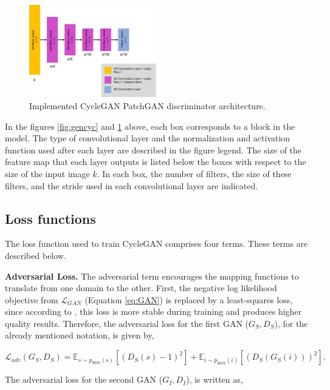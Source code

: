 \begin{figure}[!htb]
  \centering
  \includegraphics[width=0.50\textwidth]{Images/discriminator_cyclegan.jpg}
  \caption{Implemented CycleGAN PatchGAN discriminator architecture.}
  \label{fig:disccyc}
\end{figure}

In the figures \ref{fig:gencyc} and \ref{fig:disccyc} above, each box corresponds to a block in the model. The type of convolutional layer and the normalization and activation function used after each layer are described in the figure legend. The size of the feature map that each layer outputs is listed below the boxes with respect to the size of the input image $k$. In each box, the number of filters, the size of these filters, and the stride used in each convolutional layer are indicated.

\subsection*{Loss functions}

The loss function used to train CycleGAN comprises four terms. These terms are described below.

\textbf{Adversarial Loss.} The adversarial term encourages the mapping functions to translate from one domain to
the other. First, the negative log likelihood objective from $\mathcal{L}_{GAN}$  (Equation \ref{eq:GAN}) is replaced by a least-squares loss, since according to \cite{cycleGAN:original}, this loss is more stable during training and produces higher quality results. Therefore, the adversarial loss for the first GAN ($G_{S}, D_S$), for the already mentioned notation, is given by,

\begin{equation}
    \mathcal{L}_{adv}(G_{S},D_S) = \mathbb{E}_{s \sim p_{data}(s)} [(D_S(s)-1)^2] + \mathbb{E}_{i \sim p_{data}(i)} [(D_S(G_{S}(i)))^2].
\end{equation}

The adversarial loss for the second GAN ($G_{I}, D_I$), is written as,

